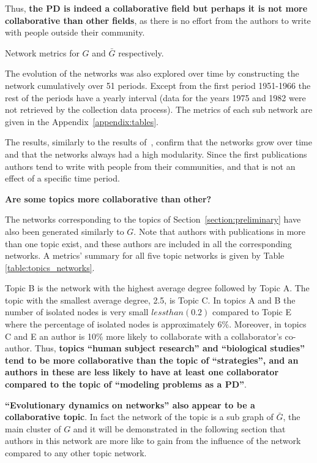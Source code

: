 \documentclass{article}
\theoremstyle{definition}
\begin{document}
Thus, \textbf{the PD is indeed a collaborative field but perhaps it is not
more collaborative than other fields}, as there is no effort from the authors
to write with people outside their community.

\begin{table}[!hbtp]
    \centering
    \resizebox{\textwidth}{!}{
    }
    \caption{Network metrics for \(G\) and \(\bar{G}\) respectively.}
    \label{table:network_comparison}
\end{table}

The evolution of the networks was also explored over time by constructing the
network cumulatively over 51 periods. Except from the first period 1951-1966 the
rest of the periods have a yearly interval (data for the years 1975 and 1982
were not retrieved by the collection data process). The metrics of each sub
network are given in the Appendix~\ref{appendix:tables}.

The results, similarly to the results of~\cite{Liu2015}, confirm that the
networks grow over time and that the networks always had a high modularity.
Since the first publications authors tend to write with people from their
communities, and that is not an effect of a specific time period.

\textbf{Are some topics more collaborative than other?}

The networks corresponding to the topics of Section~\ref{section:preliminary} have
also been generated similarly to \(G\). Note that authors with publications in
more than one topic exist, and these authors are included in all the corresponding
networks. A metrics' summary for all five topic networks is given by Table
\ref{table:topics_networks}.

Topic B is the network with the highest average degree followed by Topic A. The
topic with the smallest average degree, 2.5, is Topic C. In topics A and B the
number of isolated nodes is very small \(less than (0.2)\) compared to Topic E where the
percentage of isolated nodes is approximately 6\%. Moreover, in topics C and E
an author is 10\% more likely to collaborate with a collaborator's co-author.
Thus, \textbf{topics ``human subject research'' and ``biological studies'' tend
to be more collaborative than the topic of ``strategies'', and an authors in
these are less likely to have at least one collaborator compared to the topic of
``modeling problems as a PD''}.

\textbf{``Evolutionary dynamics on networks'' also appear to be a collaborative topic}.
In fact the network of the topic  is a
sub graph of \(\bar{G}\), the main cluster of \(G\) and it will be demonstrated in the following section that
authors in this network are more like to gain from the influence of the network
compared to any other topic network.
\end{document}
